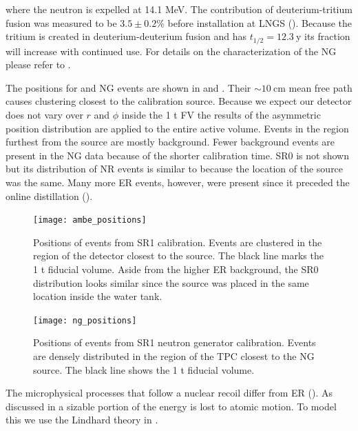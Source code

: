 \noindent where the neutron is expelled at 14.1 MeV.  The contribution of deuterium-tritium fusion was measured to be $3.5 \pm 0.2\%$
before installation at LNGS ().  Because the tritium is created in deuterium-deuterium fusion and has
$t_{1/2} = 12.3\ \mathrm{y}$ its fraction will increase with continued use.  For details on the characterization of the NG
please refer to .

The positions for \ambe and NG events are shown in  and
.  Their ${\sim}10\ \mathrm{cm}$ mean free path causes clustering
closest to the calibration source.  Because we expect our
detector does not vary over $r$ and $\phi$ inside the 1 t FV the results of the asymmetric position distribution are applied to the entire
active volume.  Events in the region furthest from the source are mostly background.  Fewer background events are present in the NG data
because of the shorter calibration time.  SR0 \ambe is not shown but its distribution of NR events is similar to
 because the location of the source was the same.  Many more ER events,
however, were present since it preceded the online distillation ().

\begin{figure}
\centering
\texttt{[image: ambe\_positions]}
\caption{Positions of events from SR1 \ambe calibration.  Events are clustered in the region of the detector closest to the \ambe
source.  The black line marks the 1 t fiducial volume.  Aside from the higher ER background, the SR0 distribution looks similar since the
source was placed in the same location inside the water tank.}
\label{fig:er_nr_calibrations_parameter_determ_nr_ambe_positions}
\end{figure}

\begin{figure}
\centering
\texttt{[image: ng\_positions]}
\caption{Positions of events from SR1 neutron generator calibration.  Events are densely distributed in the region of the TPC closest to
the NG source.  The black line shows the 1 t fiducial volume.}
\label{fig:er_nr_calibrations_parameter_determ_nr_ng_positions}
\end{figure}

The microphysical processes that follow a nuclear recoil differ from ER ().  As
discussed in  a sizable portion of the energy is lost to atomic motion.  To model this we use the Lindhard theory
in .

